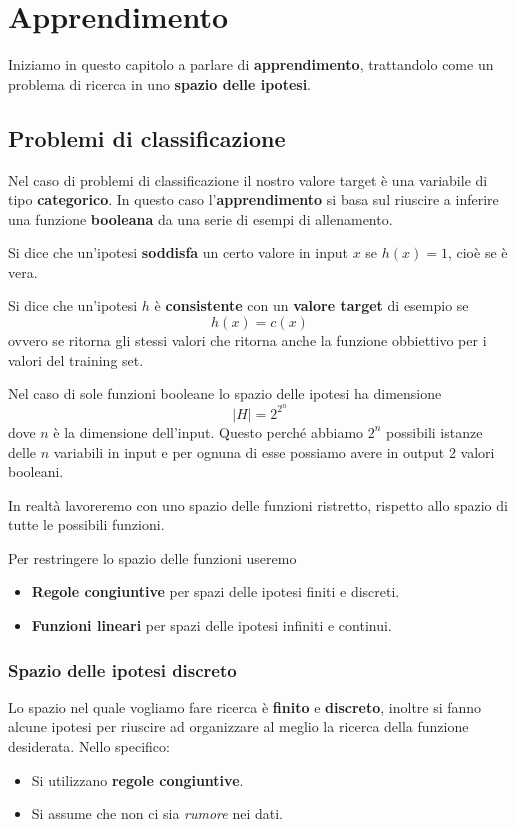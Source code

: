 \chapter{Apprendimento}
Iniziamo in questo capitolo a parlare di \textbf{apprendimento}, trattandolo come un problema di ricerca in uno
\textbf{spazio delle ipotesi}.

\section{Problemi di classificazione}
Nel caso di problemi di classificazione il nostro valore target \`e una variabile di tipo \textbf{categorico}. In questo
caso l'\textbf{apprendimento} si basa sul riuscire a inferire una funzione \textbf{booleana} da una serie di
esempi di allenamento.

\begin{definition}
	Si dice che un'ipotesi \textbf{soddisfa} un certo valore in input $x$ se $h(x) = 1$, cio\`e se \`e vera.
\end{definition}

\begin{definition}\label{def: consistente}
	Si dice che un'ipotesi $h$ \`e \textbf{consistente} con un \textbf{valore target} di esempio se
	\[ h(x) = c(x) \]
	ovvero se ritorna gli stessi valori che ritorna anche la funzione obbiettivo per i valori del training set.
\end{definition}

Nel caso di sole funzioni booleane lo spazio delle ipotesi ha dimensione
\[ |H| = 2^{2^n} \]
dove $n$ \`e la dimensione dell'input. Questo perch\'e abbiamo $2^n$ possibili istanze delle $n$ variabili in input e
per ognuna di esse possiamo avere in output 2 valori booleani.

In realt\`a lavoreremo con uno spazio delle funzioni ristretto, rispetto allo spazio di tutte le
possibili funzioni.

Per restringere lo spazio delle funzioni useremo
\begin{itemize}
	\item \textbf{Regole congiuntive} per spazi delle ipotesi finiti e discreti.
	\item \textbf{Funzioni lineari} per spazi delle ipotesi infiniti e continui.
\end{itemize}

\subsection{Spazio delle ipotesi discreto}
Lo spazio nel quale vogliamo fare ricerca \`e \textbf{finito} e \textbf{discreto}, inoltre si fanno alcune ipotesi per
riuscire ad organizzare al meglio la ricerca della funzione desiderata. Nello specifico:
\begin{itemize}
	\item Si utilizzano \textbf{regole congiuntive}.
	\item Si assume che non ci sia \emph{rumore} nei dati.
\end{itemize}

